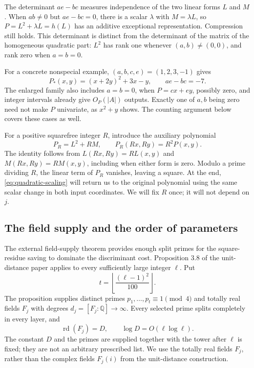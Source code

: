 The determinant $ae-bc$ measures independence of the two linear forms $L$ and $M$. When $ab\ne0$ but $ae-bc=0$, there is a scalar $\lambda$ with $M=\lambda L$, so $P=L^2+\lambda L=h(L)$ has an additive exceptional representation. Compression still holds. This determinant is distinct from the determinant of the matrix of the homogeneous quadratic part: $L^2$ has rank one whenever $(a,b)\ne(0,0)$, and rank zero when $a=b=0$.

For a concrete nonspecial example, $(a,b,c,e)=(1,2,3,-1)$ gives
\[
P_*(x,y)=(x+2y)^2+3x-y,
\qquad ae-bc=-7.
\]
The enlarged family also includes $a=b=0$, when $P=cx+ey$, possibly zero, and integer intervals already give $O_P(|A|)$ outputs. Exactly one of $a,b$ being zero need not make $P$ univariate, as $x^2+y$ shows. The counting argument below covers these cases as well.

For a positive squarefree integer $R$, introduce the auxiliary polynomial
\begin{equation}
P_R=L^2+RM,
\qquad P_R(Rx,Ry)=R^2P(x,y).
\label{eq:quadratic-scaling}
\end{equation}
The identity follows from $L(Rx,Ry)=RL(x,y)$ and $M(Rx,Ry)=RM(x,y)$, including when either form is zero. Modulo a prime dividing $R$, the linear term of $P_R$ vanishes, leaving a square. At the end, \eqref{eq:quadratic-scaling} will return us to the original polynomial using the same scalar change in both input coordinates. We will fix $R$ once; it will not depend on $j$.

\subsection{The field supply and the order of parameters}
\label{subsec:quadratic-fields}
The external field-supply theorem provides enough split primes for the square-residue saving to dominate the discriminant cost. Proposition 3.8 of the unit-distance paper \cite{ref1} applies to every sufficiently large integer $\ell$. Put
\[
t=\left\lfloor\frac{(\ell-1)^2}{100}\right\rfloor.
\]
The proposition supplies distinct primes $p_1,\ldots,p_t\equiv1\pmod4$ and totally real fields $F_j$ with degrees $d_j=[F_j:\mathbb Q]\to\infty$. Every selected prime splits completely in every layer, and
\begin{equation}
\operatorname{rd}(F_j)=D,
\qquad \log D=O(\ell\log\ell).
\label{eq:quadratic-field-supply}
\end{equation}
The constant $D$ and the primes are supplied together with the tower after $\ell$ is fixed; they are not an arbitrary prescribed list. We use the totally real fields $F_j$, rather than the complex fields $F_j(i)$ from the unit-distance construction.

